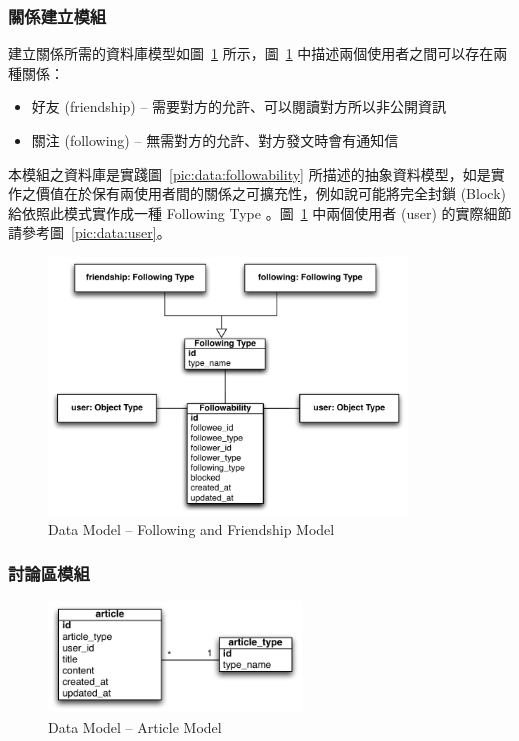 \subsubsection{關係建立模組}
\label{sssec:following}
建立關係所需的資料庫模型如圖~\ref{pic:data:user2user} 所示，圖~\ref{pic:data:user2user} 中描述兩個使用者之間可以存在兩種關係：
\begin{itemize}
\item{好友 (friendship) -- 需要對方的允許、可以閱讀對方所以非公開資訊}
\item{關注 (following) -- 無需對方的允許、對方發文時會有通知信}
\end{itemize}
本模組之資料庫是實踐圖~\ref{pic:data:followability} 所描述的抽象資料模型，如是實作之價值在於保有兩使用者間的關係之可擴充性，例如說可能將完全封鎖 (Block) 給依照此模式實作成一種 Following Type 。圖~\ref{pic:data:user2user} 中兩個使用者 (user) 的實際細節請參考圖~\ref{pic:data:user}。

\begin{figure}[H]
\centering
\includegraphics[width=0.85\textwidth]{img/user2user.pdf}
\caption{Data Model -- Following and Friendship Model}
\label{pic:data:user2user}
\end{figure}

\subsubsection{討論區模組}
\label{sssec:forum}

\begin{figure}[H]
\centering
\includegraphics[width=0.6\textwidth]{img/article.pdf}
\caption{Data Model -- Article Model}
\label{pic:data:article}
\end{figure}



